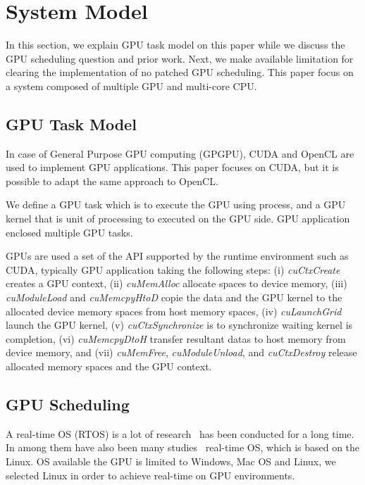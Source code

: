 \section{System Model}\label{sec:system_model}
In this section, we explain GPU task model on this paper while we discuss the GPU scheduling question and prior work.
Next, we make available limitation for clearing the implementation of no patched GPU scheduling.
This paper focus on a system composed of multiple GPU and multi-core CPU.

\subsection{GPU Task Model}
In case of  General Purpose GPU computing (GPGPU), CUDA and OpenCL are used to implement GPU applications.
This paper focuses on CUDA, but it is possible to adapt the same approach to OpenCL.

We define a GPU task which is to execute the GPU using process,
and a GPU kernel that is unit of processing to executed on the GPU side.
GPU application enclosed multiple GPU tasks.

GPUs are used a set of the API supported by the runtime environment such as CUDA,
typically GPU application taking the following steps:
(i) \textit{cuCtxCreate} creates a GPU context,
(ii) \textit{cuMemAlloc} allocate spaces to device memory, 
(iii) \textit{cuModuleLoad} and \textit{cuMemcpyHtoD} copie the data and the GPU kernel to the allocated device memory spaces from host memory spaces,
(iv) \textit{cuLaunchGrid} launch the GPU kernel, 
(v) \textit{cuCtxSynchronize} is to synchronize waiting kernel is completion, 
(vi) \textit{cuMemcpyDtoH} transfer resultant datas to host memory from device memory, and
(vii) \textit{cuMemFree}, \textit{cuModuleUnload}, and \textit{cuCtxDestroy} release allocated memory spaces and the GPU context.



\subsection{GPU Scheduling}
A real-time OS (RTOS) is a lot of research~\cite{spring, redline,itron,rk} has been conducted for a long time.
In among them have also been many studies~\cite{litmus,prk,rtai,yodaiken1999rtlinux,kato2009loadable} real-time OS, which is based on the Linux.
OS available the GPU is limited to Windows, Mac OS and Linux,
we selected Linux in order to achieve real-time on GPU environments.

